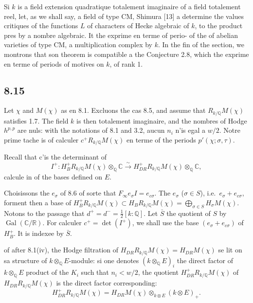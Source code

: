 \documentclass[12pt,a4paper]{article}
\theoremstyle{plain}
\theoremstyle{definition}
\theoremstyle{remark}
\DeclareMathOperator{\Gal}{Gal}
\newcommand{\Q}{\mathbb{Q}}
\newcommand{\R}{\mathbb{R}}
\newcommand{\C}{\mathbb{C}}
\begin{document}
Si $k$ is a field extension quadratique totalement imaginaire of a field
totalement reel, let, as we shall say, a field of type CM, Shimura [13] a
determine the values critiques of the functions $L$ of characters of Hecke algebraic
 of $k$, to the product pres by a nombre algebraic. It the exprime en terme of perio-
of the of abelian varieties of type CM, a multiplication complex by $k$. In the
fin of the section, we montrons that son theorem is compatible a the Conjecture
2.8, which the exprime en terme of periods of motives on $k$, of rank 1.

\subsection*{8.15}

Let $\chi$ and $M(\chi)$ as en 8.1. Excluons the cas 8.5, and assume that
$R_{k/\Q} M(\chi)$ satisfies 1.7. The field $k$ is then totalement imaginaire, and the nombres
of Hodge $h^{p,p}$ are nuls: with the notations of 8.1 and 3.2, aucun $n_i$ n'is egal a $w/2$.
Notre prime tache is of calculer $c^+ R_{k/\Q} M(\chi)$ en terme of the periods
$p'(\chi; \sigma, \tau)$.

Recall that c'is the determinant of
\[
I^+: H_B^+ R_{k/\Q} M(\chi) \otimes_\Q \C \xrightarrow{\sim} H_{DR}^+ R_{k/\Q} M(\chi) \otimes_\Q \C,
\]
calcule in of the bases defined on $E$.

Choisissons the $e_\sigma$ of 8.6 of sorte that $F_\infty e_\sigma I = e_{c\sigma}$. The $e_\sigma$
($\sigma \in S$), i.e.~$e_\sigma + e_{c\sigma}$, forment then a base of $H_B^+ R_{k/\Q} M(\chi) \subset
H_B R_{k/\Q} M(\chi) = \bigoplus_{\sigma \in S} H_\sigma M(\chi)$. Notons to the passage that
$d^+ = d^- = \tfrac{1}{2}[k:\Q]$. Let $\bar{S}$ the quotient of $S$ by $\Gal(\C/\R)$. For calculer
$c^+ = \det(I^+)$, we shall use the base $(e_\sigma + e_{c\sigma})$ of $H_B^+$. It is indexee
by $\bar{S}$.

of after 8.1(iv), the Hodge filtration of $H_{DR} R_{k/\Q} M(\chi) = H_{DR} M(\chi)$ se lit
on sa structure of $k \otimes_\Q E$-module: si one denotes $(k \otimes_\Q E)_i$ the direct factor of
$k \otimes_\Q E$ product of the $K_i$ such that $n_i < w/2$, the quotient $H_{DR}^+ R_{k/\Q} M(\chi)$
of $H_{DR} R_{k/\Q} M(\chi)$ is the direct factor corresponding:
\[
H_{DR}^+ R_{k/\Q} M(\chi) = H_{DR} M(\chi) \otimes_{k \otimes E} (k \otimes E)_+.
\]
\end{document}
